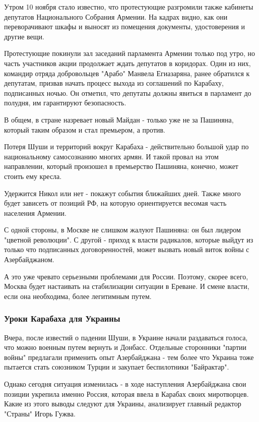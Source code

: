 Утром 10 ноября стало известно, что протестующие разгромили также кабинеты
депутатов Национального Собрания Армении. На кадрах видно, как они
переворачивают шкафы и выносят из помещения документы, удостоверения и другие
вещи.

Протестующие покинули зал заседаний парламента Армении только под утро, но
часть участников акции продолжает ждать депутатов в коридорах. Один из них,
командир отряда добровольцев "Арабо" Манвела Егиазаряна, ранее обратился к
депутатам, призвав начать процесс выхода из соглашений по Карабаху, подписанных
ночью. Он отметил, что депутаты должны явиться в парламент до полудня, им
гарантируют безопасность. 

В общем, в стране назревает новый Майдан - только уже не за Пашиняна, который
таким образом и стал премьером, а против. 

Потеря Шуши и территорий вокруг Карабаха - действительно большой удар по
национальному самосознанию многих армян. И такой провал на этом направлении,
который произошел в премьерство Пашиняна, конечно, может стоить ему кресла. 

Удержится Никол или нет - покажут события ближайших дней. Также много будет
зависеть от позиций РФ, на которую ориентируется весомая часть населения
Армении.

С одной стороны, в Москве не слишком жалуют Пашиняна: он был лидером "цветной
революции". С другой - приход к власти радикалов, которые выйдут из только что
подписанных договоренностей, может вызвать новый виток войны с Азербайджаном.

А это уже чревато серьезными проблемами для России. Поэтому, скорее всего,
Москва будет настаивать на стабилизации ситуации в Ереване. И смене власти,
если она необходима, более легитимным путем. 

\subsubsection{Уроки Карабаха для Украины}

Вчера, после известий о падении Шуши, в Украине начали раздаваться голоса, что
можно военным путем вернуть и Донбасс. Отдельные сторонники "партии войны"
предлагали применить опыт Азербайджана - тем более что Украина тоже пытается
стать союзником Турции и закупает беспилотники "Байрактар". 

Однако сегодня ситуация изменилась - в ходе наступления Азербайджана свои
позиции укрепила именно Россия, которая ввела в Карабах своих миротворцев.
Какие из этого выводы следуют для Украины, анализирует главный редактор
"Страны" Игорь Гужва. 

